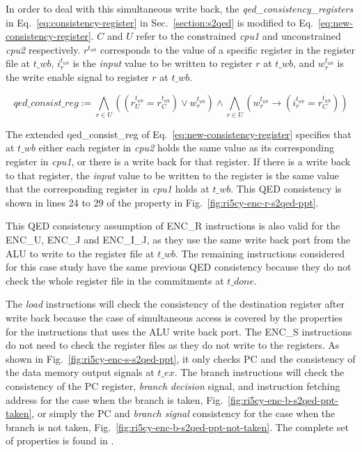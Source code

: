 In order to deal with this simultaneous write back, the \textit{qed\_consistency\_registers} in Eq.~\ref{eq:consistency-register} in Sec.~\ref{section:s2qed} is modified to Eq.~\ref{eq:new-consistency-register}. $C$ and $U$ refer to the constrained \textit{cpu1} and unconstrained \textit{cpu2} respectively. $r^{t_{wb}}$ corresponds to the value of a specific register in the register file at $t\_wb$, $i^{t_{wb}}_r$ is the \textit{input} value to be written to register $r$ at $t\_wb$, and $w^{t_{wb}}_r $ is the write enable signal to register $r$ at $t\_wb$.

\begin{equation}
    qed\_consist\_reg := \bigwedge_{r \in U} \left((r^{t_{wb}}_U = r^{t_{wb}}_C) \lor w^{t_{wb}}_r\right) \land \bigwedge_{r \in U} \left(w^{t_{wb}}_r \rightarrow (i^{t_{wb}}_r = r^{t_{wb}}_C)\right)
    \label{eq:new-consistency-register}
\end{equation}

The extended qed\_consist\_reg of Eq.~\ref{eq:new-consistency-register} specifies that at $t\_wb$ either each register in \textit{cpu2} holds the same value as its corresponding register in \textit{cpu1}, or there is a write back for that register. If there is a write back to that register, the \textit{input} value to be written to the register is the same value that the corresponding register in \textit{cpu1} holds at $t\_wb$. This QED consistency is shown in lines 24 to 29 of the property in Fig.~\ref{fig:ri5cy-enc-r-s2qed-ppt}.

This QED consistency assumption of ENC\_R instructions is also valid for the ENC\_U, ENC\_J and ENC\_I\_J, as they use the same write back port from the ALU to write to the register file at $t\_wb$. The remaining instructions considered for this case study have the same previous QED consistency because they do not check the whole register file in the commitments at $t\_done$.

The \textit{load} instructions will check the consistency of the destination register after write back because the case of simultaneous access is covered by the properties for the instructions that uses the ALU write back port. The ENC\_S instructions do not need to check the register files as they do not write to the registers. As shown in Fig.~\ref{fig:ri5cy-enc-s-s2qed-ppt}, it only checks PC and the consistency of the data memory output signals at $t\_ex$. The branch instructions will check the consistency of the PC register, \textit{branch decision} signal, and instruction fetching address for the case when the branch is taken, Fig.~\ref{fig:ri5cy-enc-b-s2qed-ppt-taken}, or simply the PC and \textit{branch signal} consistency for the case when the branch is not taken, Fig.~\ref{fig:ri5cy-enc-b-s2qed-ppt-not-taken}. The complete set of \SSQED{} properties is found in \cite{descam}.

